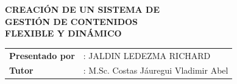 \begin{titlepage}
\begin{center}
\begin{picture}
\end{picture}

\vfill

\textbf{\large \huge CREACI\'ON DE UN SISTEMA DE}\\[23pt]
\textbf{\large \huge GESTI\'ON DE CONTENIDOS}\\ \vspace{8.5mm}
\textbf{\large \huge FLEXIBLE Y DIN\'AMICO}
\end{center}

\vspace{30pt}


\vspace{60pt}

\begin{flushright}
\begin{tabular}[]{ll}
\textbf{Presentado por}     &   : {\large JALDIN LEDEZMA RICHARD           }\\
\textbf{Tutor}              &   : M.Sc. Costas J\'auregui Vladimir Abel   \\
\end{tabular}
\end{flushright}

\vfill\par\noindent

\end{titlepage}
